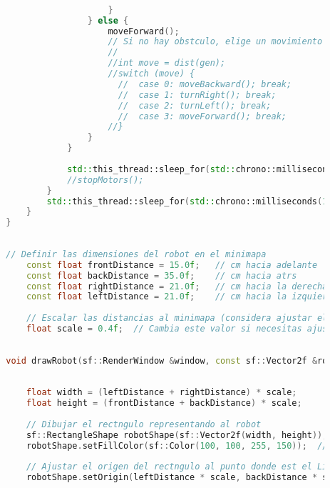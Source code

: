 \begin{lstlisting}[language={C++}, caption={Quinto ajuste de c\'odigo}, label={QuintoAjuste}]
                                
                                
                            }
                        } else {
                            moveForward();
                            // Si no hay obstculo, elige un movimiento aleatorio
                            //
                            //int move = dist(gen);
                            //switch (move) {
                              //  case 0: moveBackward(); break;
                              //  case 1: turnRight(); break;
                              //  case 2: turnLeft(); break;
                              //  case 3: moveForward(); break;
                            //}
                        }
                    }
                    
                    std::this_thread::sleep_for(std::chrono::milliseconds(500));
                    //stopMotors();
                }
                std::this_thread::sleep_for(std::chrono::milliseconds(100));
            }
        }
        
        
        // Definir las dimensiones del robot en el minimapa
            const float frontDistance = 15.0f;   // cm hacia adelante
            const float backDistance = 35.0f;    // cm hacia atrs
            const float rightDistance = 21.0f;   // cm hacia la derecha
            const float leftDistance = 21.0f;    // cm hacia la izquierda
        
            // Escalar las distancias al minimapa (considera ajustar el factor de escala segn lo necesites)
            float scale = 0.4f;  // Cambia este valor si necesitas ajustar el tamao del robot en el minimapa
        
        
        void drawRobot(sf::RenderWindow &window, const sf::Vector2f &robotPosition, const sf::RectangleShape &minimap) {
            
        
            float width = (leftDistance + rightDistance) * scale;
            float height = (frontDistance + backDistance) * scale;
        
            // Dibujar el rectngulo representando al robot
            sf::RectangleShape robotShape(sf::Vector2f(width, height));
            robotShape.setFillColor(sf::Color(100, 100, 255, 150));  // Color azul claro con algo de transparencia
        
            // Ajustar el origen del rectngulo al punto donde est el LiDAR, es decir, al centro del robot
            robotShape.setOrigin(leftDistance * scale, backDistance * scale);
        

\end{lstlisting}
